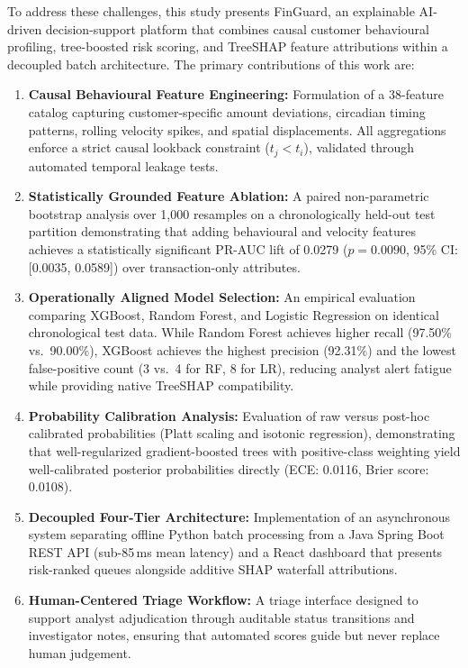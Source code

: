 \documentclass[conference]{IEEEtran}
\begin{document}
To address these challenges, this study presents FinGuard, an explainable AI-driven decision-support platform that combines causal customer behavioural profiling, tree-boosted risk scoring, and TreeSHAP feature attributions within a decoupled batch architecture. The primary contributions of this work are:
\begin{enumerate}
    \item \textbf{Causal Behavioural Feature Engineering:} Formulation of a 38-feature catalog capturing customer-specific amount deviations, circadian timing patterns, rolling velocity spikes, and spatial displacements. All aggregations enforce a strict causal lookback constraint ($t_j < t_i$), validated through automated temporal leakage tests.
    \item \textbf{Statistically Grounded Feature Ablation:} A paired non-parametric bootstrap analysis over 1,000 resamples on a chronologically held-out test partition demonstrating that adding behavioural and velocity features achieves a statistically significant PR-AUC lift of 0.0279 ($p = 0.0090$, 95\% CI: [0.0035, 0.0589]) over transaction-only attributes.
    \item \textbf{Operationally Aligned Model Selection:} An empirical evaluation comparing XGBoost, Random Forest, and Logistic Regression on identical chronological test data. While Random Forest achieves higher recall (97.50\% vs.\ 90.00\%), XGBoost achieves the highest precision (92.31\%) and the lowest false-positive count (3 vs.\ 4 for RF, 8 for LR), reducing analyst alert fatigue while providing native TreeSHAP compatibility.
    \item \textbf{Probability Calibration Analysis:} Evaluation of raw versus post-hoc calibrated probabilities (Platt scaling and isotonic regression), demonstrating that well-regularized gradient-boosted trees with positive-class weighting yield well-calibrated posterior probabilities directly (ECE: 0.0116, Brier score: 0.0108).
    \item \textbf{Decoupled Four-Tier Architecture:} Implementation of an asynchronous system separating offline Python batch processing from a Java Spring Boot REST API (sub-85\,ms mean latency) and a React dashboard that presents risk-ranked queues alongside additive SHAP waterfall attributions.
    \item \textbf{Human-Centered Triage Workflow:} A triage interface designed to support analyst adjudication through auditable status transitions and investigator notes, ensuring that automated scores guide but never replace human judgement.
\end{enumerate}
\end{document}
